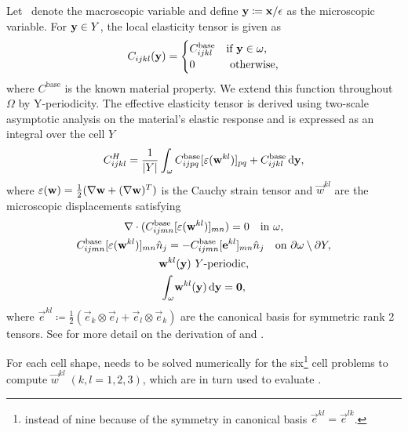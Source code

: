 \documentclass[twocolumn,10pt]{article}
\begin{document}
Let \x\ denote the macroscopic variable and define $\mathbf y\coloneqq \mathbf x/\epsilon$
as the microscopic variable. For ${\mathbf y} \in Y$, the local elasticity
tensor is given as
\begin{equation}
  \label{eqn:microC}
  C_{ijkl} (\mathbf y) = \begin{cases} C_{ijkl}^\text{base} & \text{if } \mathbf y
  \in \omega, \\ 0 & \text{ otherwise,} \end{cases}
\end{equation}
where $C^\text{base}$ is the known material property. We extend this
function throughout $\Omega$ by Y-periodicity. The effective
elasticity tensor is derived using two-scale asymptotic analysis on
the material's elastic response and is expressed as an integral over
the cell $Y$
\begin{equation}
  \label{eqn:effective}
  C^H_{ijkl} = \frac{1}{|Y|} \int_\omega C_{ijpq}^\text{base} [\varepsilon(\mathbf w^{kl})]_{pq} + C_{ijkl}^\text{base} \, \mathrm{d} \mathbf y,
\end{equation}
where $\varepsilon(\mathbf w)=\frac{1}{2}(\nabla \mathbf w + (\nabla
\mathbf w)^T)$ is the Cauchy strain tensor and $\vec{w}^{kl}$ are the
microscopic displacements satisfying
\begin{subequations}
  \label{set:cell}
  \begin{gather}
    \nabla \cdot (C^\text{base}_{ijmn}[\varepsilon({\bf w}^{kl})]_{mn}) = 0 \quad \text{in } \omega, \\
    C^\text{base}_{ijmn}[\varepsilon({\bf w}^{kl})]_{mn}\hat{n}_j  =  - C^\text{base}_{ijmn}[\mathbf e^{kl}]_{mn} \hat{n}_j  \quad \text{on } \partial \omega \setminus \partial Y, \\
    {\bf w}^{kl}({\mathbf y})\ Y\text{-periodic}, \\
    \int_\omega \! {\bf w}^{kl}({\mathbf y})  \, \mathrm{d} {\mathbf y} =  {\bf 0},
  \end{gather}
\end{subequations}
where $\vec{e}^{kl} \coloneqq \frac{1}{2} \left(\vec{e}_k \otimes
\vec{e}_l + \vec{e}_l \otimes \vec{e}_k \right)$ are the canonical
basis for symmetric rank 2 tensors. See  for more
detail on the derivation of  and .

For each cell shape,  needs to be solved numerically for
the six\footnote{instead of nine because of the symmetry in canonical
  basis $\vec{e}^{kl} = \vec{e}^{lk}$.} cell problems to compute
$\vec{w}^{kl}\;(k,l=1,2,3)$, which are in turn used to evaluate
.
\end{document}
